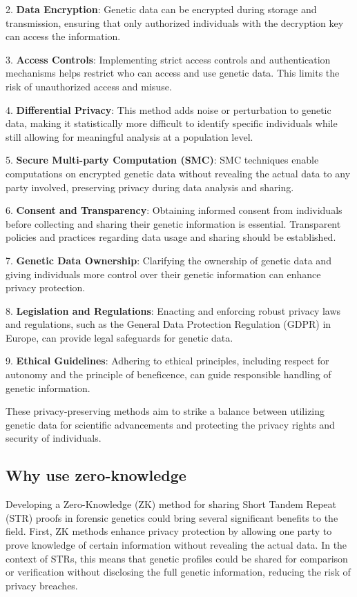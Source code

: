 \documentclass{article}
\begin{document}
2. \textbf{Data Encryption}: Genetic data can be encrypted during storage and transmission, ensuring that only authorized individuals with the decryption key can access the information.

3. \textbf{Access Controls}: Implementing strict access controls and authentication mechanisms helps restrict who can access and use genetic data. This limits the risk of unauthorized access and misuse.

4. \textbf{Differential Privacy}: This method adds noise or perturbation to genetic data, making it statistically more difficult to identify specific individuals while still allowing for meaningful analysis at a population level.

5. \textbf{Secure Multi-party Computation (SMC)}: SMC techniques enable computations on encrypted genetic data without revealing the actual data to any party involved, preserving privacy during data analysis and sharing.

6. \textbf{Consent and Transparency}: Obtaining informed consent from individuals before collecting and sharing their genetic information is essential. Transparent policies and practices regarding data usage and sharing should be established.

7. \textbf{Genetic Data Ownership}: Clarifying the ownership of genetic data and giving individuals more control over their genetic information can enhance privacy protection.

8. \textbf{Legislation and Regulations}: Enacting and enforcing robust privacy laws and regulations, such as the General Data Protection Regulation (GDPR) in Europe, can provide legal safeguards for genetic data.

9. \textbf{Ethical Guidelines}: Adhering to ethical principles, including respect for autonomy and the principle of beneficence, can guide responsible handling of genetic information.

These privacy-preserving methods aim to strike a balance between utilizing genetic data for scientific advancements and protecting the privacy rights and security of individuals.

\subsection{Why use zero-knowledge}

Developing a Zero-Knowledge (ZK) method for sharing Short Tandem Repeat (STR) proofs in forensic genetics could bring several significant benefits to the field. First, ZK methods enhance privacy protection by allowing one party to prove knowledge of certain information without revealing the actual data. In the context of STRs, this means that genetic profiles could be shared for comparison or verification without disclosing the full genetic information, reducing the risk of privacy breaches.
\end{document}
